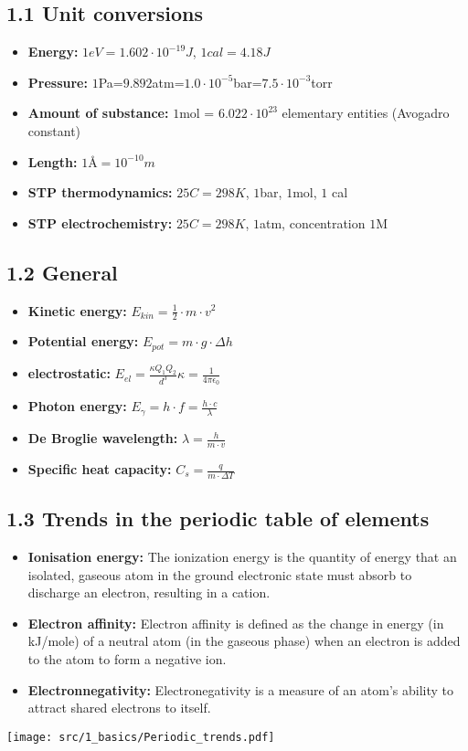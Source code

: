\subsection{1.1 Unit conversions}
	\begin{itemize}
  		\item \textbf{Energy:} $1eV=1.602\cdot 10^{-19}J$,    $1cal=4.18J$
    	\item \textbf{Pressure:} $1$Pa=$9.892$atm=$1.0\cdot 10^{-5}$bar=$7.5\cdot 10^{-3}$torr
    	\item \textbf{Amount of substance:} $1$mol = $6.022\cdot 10^{23}$ elementary entities (Avogadro constant)
    	\item \textbf{Length:} $1\text{Å}=10^{-10}m$
    	\item \textbf{STP thermodynamics: } $25C=298K$,  $1$bar,  $1$mol, $1$ cal
    	\item \textbf{STP electrochemistry: } $25C=298K$,  $1$atm, concentration $1$M
	\end{itemize}

\subsection{1.2 General}
    \begin{itemize}
        \item \textbf{Kinetic energy:} $E_{kin} = \frac{1}{2} \cdot m \cdot v^2$
        \item \textbf{Potential energy:} $E_{pot} = m \cdot g \cdot \Delta h$
        \item \textbf{electrostatic:} $E_{el}=\frac{\kappa Q_1Q_2}{d^3}$\quad $\kappa = \frac{1}{4\pi \epsilon_0}$
        \item \textbf{Photon energy: } $E_\gamma = h\cdot f = \frac{h\cdot c}{\lambda}$
        \item \textbf{De Broglie wavelength: } $\lambda = \frac{h}{m\cdot v}$
        \item \textbf{Specific heat capacity: }$C_s=\frac{q}{m\cdot\Delta T}$
    \end{itemize}
    	
\subsection{1.3 Trends in the periodic table of elements}
	\begin{itemize}
    	\item \textbf{Ionisation energy: }The ionization energy is the quantity of energy that an isolated, gaseous atom in the ground electronic state must absorb to discharge an electron, resulting in a cation.
    	\item \textbf{Electron affinity: }Electron affinity is defined as the change in energy (in kJ/mole) of a neutral atom (in the gaseous phase) when an electron is added to the atom to form a negative ion.
    	\item \textbf{Electronnegativity:} Electronegativity is a measure of an atom's ability to attract shared electrons to itself.
	\end{itemize}
	\texttt{[image: src/1\_basics/Periodic\_trends.pdf]}